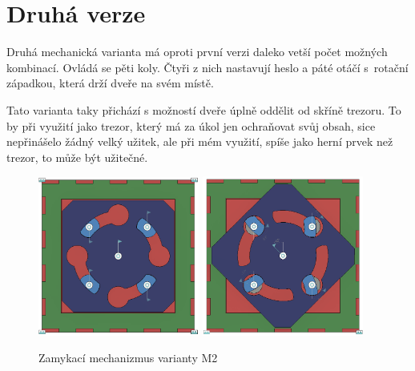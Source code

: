 \section{Druhá verze}

Druhá mechanická varianta má oproti první verzi daleko vetší počet možných kombinací.
Ovládá se pěti koly. Čtyři z nich nastavují heslo a páté otáčí s~rotační západkou, která drží dveře na svém místě.

Tato varianta taky přichází s možností dveře úplně oddělit od skříně trezoru. To by při využití jako trezor, který
má za úkol jen ochraňovat svůj obsah, sice nepřinášelo žádný velký užitek, ale při mém využití, spíše jako herní 
prvek než trezor, to může být užitečné.

\begin{figure}[htbp]
    \centering
    \includegraphics[width=150pt]{kapitoly/obrazky/M2/mechanizmus_odemcen.png}
    \includegraphics[width=150pt]{kapitoly/obrazky/M2/mechanizmus_zamceno.png}
    \caption{Zamykací mechanizmus varianty M2}
    \label{fig:M2-mechanizmus}
\end{figure}


